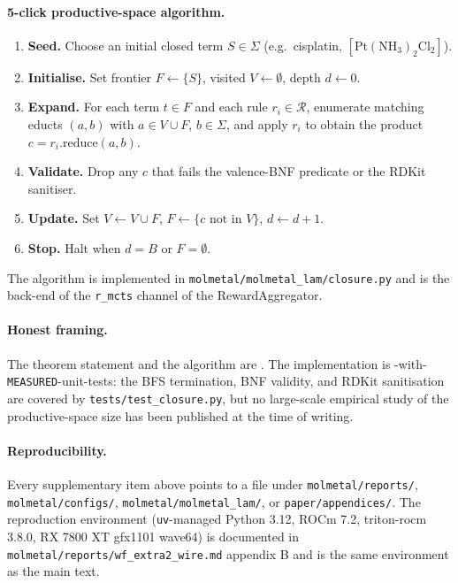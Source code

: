 \paragraph{5-click productive-space algorithm.}
\begin{enumerate}
  \item \textbf{Seed.}  Choose an initial closed term $S \in \Sigma$
        (e.g.\ cisplatin, $[\text{Pt}(\text{NH}_3)_2\text{Cl}_2]$).
  \item \textbf{Initialise.}  Set frontier $F \leftarrow \{S\}$,
        visited $V \leftarrow \emptyset$, depth $d \leftarrow 0$.
  \item \textbf{Expand.}  For each term $t \in F$ and each rule
        $r_i \in \mathcal{R}$, enumerate matching educts
        $(a, b)$ with $a \in V \cup F$, $b \in \Sigma$, and apply
        $r_i$ to obtain the product $c = r_i.\text{reduce}(a, b)$.
  \item \textbf{Validate.}  Drop any $c$ that fails the valence-BNF
        predicate or the RDKit sanitiser.
  \item \textbf{Update.}  Set $V \leftarrow V \cup F$, $F \leftarrow
        \{c \text{ not in } V\}$, $d \leftarrow d+1$.
  \item \textbf{Stop.}  Halt when $d = B$ or $F = \emptyset$.
\end{enumerate}
The algorithm is implemented in
\texttt{molmetal/molmetal\_lam/closure.py} and is the back-end of the
\texttt{r\_mcts} channel of the RewardAggregator.

\paragraph{Honest framing.}
The theorem statement and the algorithm are \DESIGN{}.  The
implementation is \DESIGN{}-with-\texttt{MEASURED}-unit-tests: the
BFS termination, BNF validity, and RDKit sanitisation are covered by
\texttt{tests/test\_closure.py}, but no large-scale empirical study of
the productive-space size has been published at the time of writing.


\paragraph{Reproducibility.}
Every supplementary item above points to a file under
\texttt{molmetal/reports/}, \texttt{molmetal/configs/},
\texttt{molmetal/molmetal\_lam/}, or \texttt{paper/appendices/}.  The
reproduction environment (\texttt{uv}-managed Python 3.12, ROCm 7.2,
triton-rocm 3.8.0, RX 7800 XT gfx1101 wave64) is documented in
\texttt{molmetal/reports/wf\_extra2\_wire.md} appendix B and is the
same environment as the main text.

